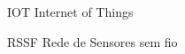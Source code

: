 %
%

\begin{siglas}
	\setlength{\baselineskip}{0.7\baselineskip}
	
	\item[IOT] Internet of Things
	\item[RSSF] Rede de Sensores sem fio
\end{siglas}
